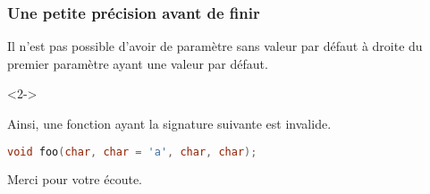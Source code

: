 \documentclass{cppcourses}
\begin{document}
\begin{frame}[fragile]

\frametitle{Une petite précision avant de finir}

\begin{warning}
Il n'est pas possible d'avoir de paramètre sans valeur par défaut à droite du premier paramètre ayant une valeur par défaut.
\end{warning}

\begin{example}<2->

Ainsi, une fonction ayant la signature suivante est invalide.

\begin{lstlisting}[language = c++]
void foo(char, char = 'a', char, char);
\end{lstlisting}

\end{example}

\end{frame}

\begin{frame}

\centering\Large

Merci pour votre écoute.

\end{frame}
\end{document}
